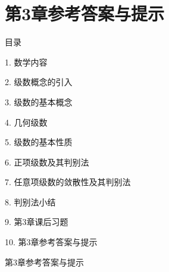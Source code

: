 \documentclass[aspectratio=169,10pt,fontset=fandol]{ctexbeamer}
\begin{document}
\section{第3章参考答案与提示}
\begin{frame}[t,fragile]{目录}
\normalsize
{\color{black}\normalsize 1. 数学内容\par}\vspace{0.3em}
{\color{black}\normalsize 2. 级数概念的引入\par}\vspace{0.3em}
{\color{black}\normalsize 3. 级数的基本概念\par}\vspace{0.3em}
{\color{black}\normalsize 4. 几何级数\par}\vspace{0.3em}
{\color{black}\normalsize 5. 级数的基本性质\par}\vspace{0.3em}
{\color{black}\normalsize 6. 正项级数及其判别法\par}\vspace{0.3em}
{\color{black}\normalsize 7. 任意项级数的敛散性及其判别法\par}\vspace{0.3em}
{\color{black}\normalsize 8. 判别法小结\par}\vspace{0.3em}
{\color{black}\normalsize 9. 第3章课后习题\par}\vspace{0.3em}
{\color{blue}\normalsize 10. 第3章参考答案与提示\par}\vspace{0.3em}
\end{frame}
\begin{frame}[t,fragile]{第3章参考答案与提示}
\normalsize
{\normalsize




}
\end{frame}
\end{document}
